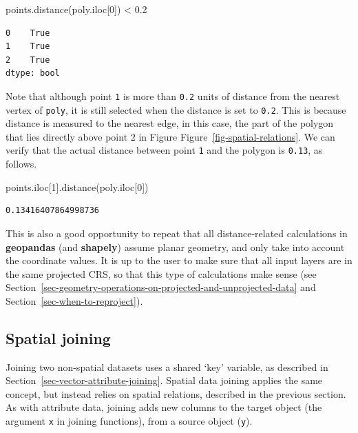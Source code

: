 \documentclass[
  letterpaper,
]{krantz}
\newenvironment{Shaded}{\begin{snugshade}}{\end{snugshade}}
\newcommand{\DecValTok}[1]{\textcolor[rgb]{0.68,0.00,0.00}{#1}}
\newcommand{\FloatTok}[1]{\textcolor[rgb]{0.68,0.00,0.00}{#1}}
\newcommand{\NormalTok}[1]{\textcolor[rgb]{0.00,0.23,0.31}{#1}}
\newcommand{\OperatorTok}[1]{\textcolor[rgb]{0.37,0.37,0.37}{#1}}
\begin{document}
\begin{Shaded}
\begin{Highlighting}[]
\NormalTok{points.distance(poly.iloc[}\DecValTok{0}\NormalTok{]) }\OperatorTok{\textless{}} \FloatTok{0.2}
\end{Highlighting}
\end{Shaded}

\begin{verbatim}
0    True
1    True
2    True
dtype: bool
\end{verbatim}

Note that although point \texttt{1} is more than \texttt{0.2} units of
distance from the nearest vertex of \texttt{poly}, it is still selected
when the distance is set to \texttt{0.2}. This is because distance is
measured to the nearest edge, in this case, the part of the polygon that
lies directly above point 2 in Figure
Figure~\ref{fig-spatial-relations}. We can verify that the actual
distance between point \texttt{1} and the polygon is \texttt{0.13}, as
follows.

\begin{Shaded}
\begin{Highlighting}[]
\NormalTok{points.iloc[}\DecValTok{1}\NormalTok{].distance(poly.iloc[}\DecValTok{0}\NormalTok{])}
\end{Highlighting}
\end{Shaded}

\begin{verbatim}
0.13416407864998736
\end{verbatim}

This is also a good opportunity to repeat that all distance-related
calculations in \textbf{geopandas} (and \textbf{shapely}) assume planar
geometry, and only take into account the coordinate values. It is up to
the user to make sure that all input layers are in the same projected
CRS, so that this type of calculations make sense (see
Section~\ref{sec-geometry-operations-on-projected-and-unprojected-data}
and Section~\ref{sec-when-to-reproject}).

\subsection{Spatial joining}\label{sec-spatial-joining}

Joining two non-spatial datasets uses a shared `key' variable, as
described in Section~\ref{sec-vector-attribute-joining}. Spatial data
joining applies the same concept, but instead relies on spatial
relations, described in the previous section. As with attribute data,
joining adds new columns to the target object (the argument \texttt{x}
in joining functions), from a source object (\texttt{y}).
\end{document}
